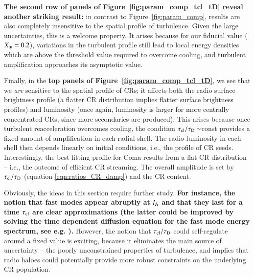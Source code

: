 \documentclass[fleqn,usenatbib,useAMS]{mnras}
\newcommand\C[1]{{\bf #1}}
\begin{document}
\C{The second row of panels of Figure~\ref{fig:param_comp_tcl_tD} reveal another
  striking result:} in contrast to Figure~\ref{fig:param_comp}, results are also
completely insensitive to the spatial profile of turbulence. Given the large
uncertainties, this is a welcome property. It arises because for our fiducial
value ($X_{\rm tu} = 0.2$), variations in the turbulent profile still lead to
local energy densities which are above the threshold value required to overcome
cooling, and turbulent amplification approaches its asymptotic value.

Finally, in the \C{top panels of Figure~\ref{fig:param_comp_tcl_tD}}, we see
that we {\it are} sensitive to the spatial profile of CRs; it affects both the
radio surface brightness profile (a flatter CR distribution implies flatter
surface brightness profiles) and luminosity (once again, luminosity is larger
for more centrally concentrated CRs, since more secondaries are produced). This
arises because once turbulent reacceleration overcomes cooling, the condition
$\tau_{\rm cl}/\tau_{\rm D} \sim$const provides a fixed amount of amplification in
each radial shell. The radio luminosity in each shell then depends linearly on
initial conditions, i.e., the profile of CR seeds. Interestingly, the
best-fitting profile for Coma results from a flat CR distribution -- i.e., the
outcome of efficient CR streaming. The overall amplitude is set by $\tau_{\rm cl}/\tau_{\rm D}$ (equation
\ref{eqn:ratios_CR_damp}) and the CR content.

Obviously, the ideas in this section require further study. \C{For instance, the notion that fast modes appear abruptly at $l_{\rm A}$ and that they last for a time $\tau_{\rm cl}$ are clear approximations (the latter could be improved by solving the time dependent diffusion equation for the fast mode energy spectrum, see e.g. \citet{zhou90}).} However, the notion that $\tau_{\rm cl}/\tau_{\rm D}$ could self-regulate around a fixed value is exciting, because it eliminates the main source of uncertainty -- the poorly unconstrained properties of turbulence, and implies that radio haloes could potentially provide more robust constraints on the underlying CR population.  
\end{document}
